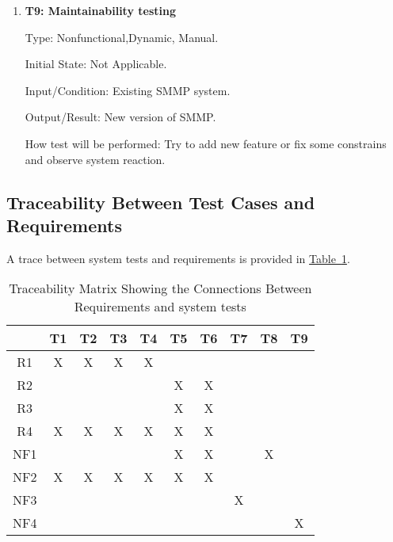 \documentclass[12pt, titlepage]{article}
\begin{document}
\begin{enumerate}

\item{\bf T9: Maintainability testing\\}

Type: Nonfunctional,Dynamic, Manual.
					
Initial State: Not Applicable.
					
Input/Condition: Existing SMMP system.
					
Output/Result: New version of SMMP.
					
How test will be performed: Try to add new feature or fix some constrains
 and
observe system reaction.  

\end{enumerate}
\subsection{Traceability Between Test Cases and Requirements} A trace between
system tests and requirements is provided in
\hyperref[tab:reqtrace]{Table~\ref*{tab:reqtrace}}.

\begin{table}[h!]
\centering
\begin{tabular}{|c|c|c|c|c|c|c|c|c|c|}
\hline
	& T1 & T2 & T3 & T4 & T5 & T6 & T7 &T8  & T9 \\
\hline
R1  & X&X&X& X& & & & & \\ \hline
R2  & & & & & X& X& &  & \\ \hline
R3  & & & & &X & X& &   &\\ \hline
R4  &X & X& X& X&X & X& & & \\ \hline
NF1 & & & & & X& X& & X &  \\ \hline
NF2   & X& X& X&X & X& X& & & \\ \hline
NF3   & & & & & & &X & & \\ \hline
NF4   & & & & & & & & &X \\ \hline
\hline
\end{tabular}
\caption{Traceability Matrix Showing the Connections Between Requirements and system tests}
\label{tab:reqtrace}
\end{table}
\end{document}
